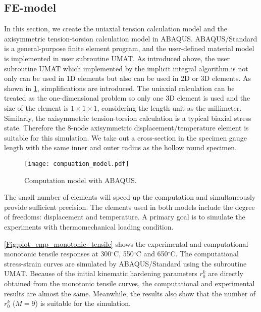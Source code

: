 \subsection{FE-model}
\noindent
In this section, we create the uniaxial tension calculation model and the axisymmetric tension-torsion calculation model in ABAQUS.
ABAQUS/Standard is a general-purpose finite element program, and the user-defined material model is implemented in user subroutine UMAT.
As introduced above, the user subroutine UMAT which implemented by the implicit integral algorithm is not only can be used in 1D elements but also can be used in 2D or 3D elements.
As shown in \ref{Fig:Compuation_model}, simplifications are introduced.
The uniaxial calculation can be treated as the one-dimensional problem so only one 3D element is used and the size of the element is $1 \times 1 \times 1$, considering the length unit as the millimeter.
Similarly, the axisymmetric tension-torsion calculation is a typical biaxial stress state. Therefore the 8-node axisymmetric displacement/temperature element is suitable for this simulation.
We take out a cross-section in the specimen gauge length with the same inner and outer radius as the hollow round specimen.

\begin{figure}[!htp]
  \centering
  \texttt{[image: compuation\_model.pdf]}
  \caption{Computation model with ABAQUS.}
  \label{Fig:Compuation_model}
\end{figure}

The small number of elements will speed up the computation and simultaneously provide sufficient precision.
The elements used in both models include the degree of freedoms: displacement and temperature.
A primary goal is to simulate the experiments with thermomechanical loading condition.

\ref{Fig:plot_cmp_monotonic_tensile} shows the experimental and computational monotonic tensile responses at 300$^\circ$C, 550$^\circ$C and 650$^\circ$C.
The computational stress-strain curves are simulated by ABAQUS/Standard using the subroutine UMAT.
Because of the initial kinematic hardening parameters $r_0^k$ are directly obtained from the monotonic tensile curves, the computational and experimental results are almost the same. Meanwhile, the results also show that the number of $r_0^k$ ($M=9$) is suitable for the simulation.

